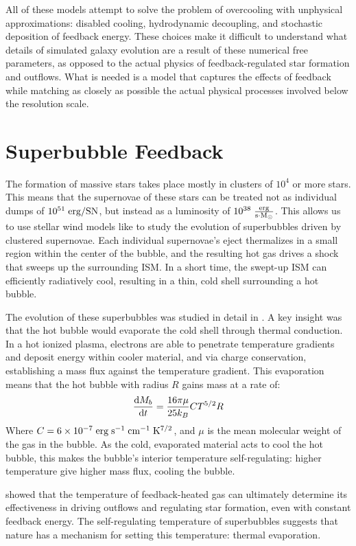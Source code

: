All of these models attempt to solve the problem of overcooling with unphysical
approximations: disabled cooling, hydrodynamic decoupling, and stochastic
deposition of feedback energy.  These choices make it difficult to understand
what details of simulated galaxy evolution are a result of these numerical free
parameters, as opposed to the actual physics of feedback-regulated star
formation and outflows.  What is needed is a model that captures the effects of
feedback while matching as closely as possible the actual physical processes
involved below the resolution scale.

\section{Superbubble Feedback}
The formation of massive stars takes place mostly in clusters of $10^4$ or more
stars.  This means that the supernovae of these stars can be treated not as
individual dumps of $10^{51}\;\rm{erg/SN}$, but instead as a luminosity of
$10^{38}\;\rm{\frac{erg}{s \cdot M_\odot}}$.  This allows us to use stellar wind
models like \citet{Weaver1977} to study the evolution of superbubbles driven by
clustered supernovae.  Each individual supernovae's eject thermalizes in a small
region within the center of the bubble, and the resulting hot gas drives a shock
that sweeps up the surrounding ISM.  In a short time, the swept-up ISM can
efficiently radiatively cool, resulting in a thin, cold shell surrounding a hot
bubble.

The evolution of these superbubbles was studied in detail in \citet{MacLow1988}.
A key insight was that the hot bubble would evaporate the cold shell through
thermal conduction.  In a hot ionized plasma, electrons are able to penetrate
temperature gradients and deposit energy within cooler material, and via charge
conservation, establishing a mass flux against the temperature gradient.  This
evaporation means that the hot bubble with radius $R$ gains mass at a rate of:
\begin{equation}
    \frac{{\rm d }M_b}{{\rm d}t} = \frac{16\pi\mu}{25k_B} CT^{5/2}R
\end{equation}
Where $C=6\times10^{-7}\;\rm{erg\;s^{-1}\;cm^{-1}\;K^{7/2}}$, and $\mu$ is the
mean molecular weight of the gas in the bubble.  As the cold, evaporated
material acts to cool the hot bubble, this makes the bubble's interior
temperature self-regulating: higher temperature give higher mass flux, cooling
the bubble.

\citet{DallaVecchia2012} showed that the temperature of feedback-heated gas can
ultimately determine its effectiveness in driving outflows and regulating star
formation, even with constant feedback energy.  The self-regulating temperature
of superbubbles suggests that nature has a mechanism for setting
this temperature: thermal evaporation.

